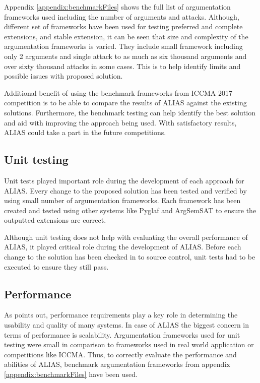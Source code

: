 Appendix \ref{appendix:benchmarkFiles} shows the full list of argumentation frameworks used including the number of arguments and attacks. Although, different set of frameworks have been used for testing preferred and complete extensions, and stable extension, it can be seen that size and complexity of the argumentation frameworks is varied. They include small framework including only 2 arguments and single attack to as much as six thousand arguments and over sixty thousand attacks in some cases. This is to help identify limits and possible issues with proposed solution. 

Additional benefit of using the benchmark frameworks from ICCMA 2017 competition is to be able to compare the results of ALIAS against the existing solutions. Furthermore, the benchmark testing can help identify the best solution and aid with improving the approach being used. With satisfactory results, ALIAS could take a part in the future competitions.

\subsection{Unit testing}
Unit tests played important role during the development of each approach for ALIAS. Every change to the proposed solution has been tested and verified by using small number of argumentation frameworks. Each framework has been created and tested using other systems like Pyglaf and ArgSemSAT to ensure the outputted extensions are correct. 

Although unit testing does not help with evaluating the overall performance of ALIAS, it played critical role during the development of ALIAS. Before each change to the solution has been checked in to source control, unit tests had to be executed to ensure they still pass. 

\subsection{Performance}
As \citet{performanceTesting1} points out, performance requirements play a key role in determining the usability and quality of many systems. In case of ALIAS the biggest concern in terms of performance is scalability. Argumentation frameworks used for unit testing were small in comparison to frameworks used in real world application or competitions like ICCMA. Thus, to correctly evaluate the performance and abilities of ALIAS, benchmark argumentation frameworks from appendix \ref{appendix:benchmarkFiles} have been used.


